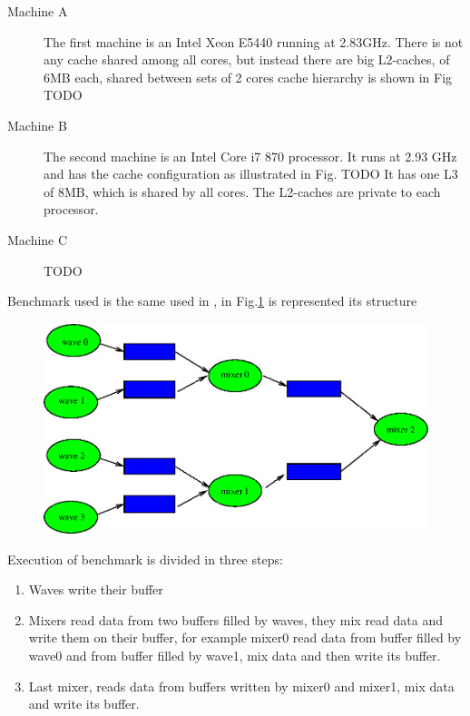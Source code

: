 \begin{description}
\item[Machine A] The first machine is an Intel Xeon E5440 running at 2.83GHz. There is not any cache shared among all cores, but instead 
there are big L2-caches, of 6MB each, shared between sets of 2 cores cache hierarchy is shown in Fig TODO

\item[Machine B] The second machine is an Intel Core i7 870 processor. It runs at 2.93 GHz and has the cache configuration as illustrated in Fig. TODO
It has one L3 of 8MB, which is shared by all cores. The L2-caches are private to each processor. 

\item[Machine C] TODO

\end{description}

Benchmark used is the same used in \cite{lcs}, in Fig.\ref{fig:bench} is represented its structure

\begin{figure}[htbp]
\centering
\includegraphics[width=\widefigure]{images/bench.eps}
\caption{}
\label{fig:bench}
\end{figure}

Execution of benchmark is divided in three steps:

\begin{enumerate}
\item Waves write their buffer
\item Mixers read data from two buffers filled by waves, they mix read data and write them on their buffer, for example mixer0 read data from buffer filled 
by wave0 and from buffer filled by wave1, mix data and then write its buffer.
\item Last mixer, reads data from buffers written by mixer0 and mixer1, mix data and write its buffer.
\end{enumerate}

